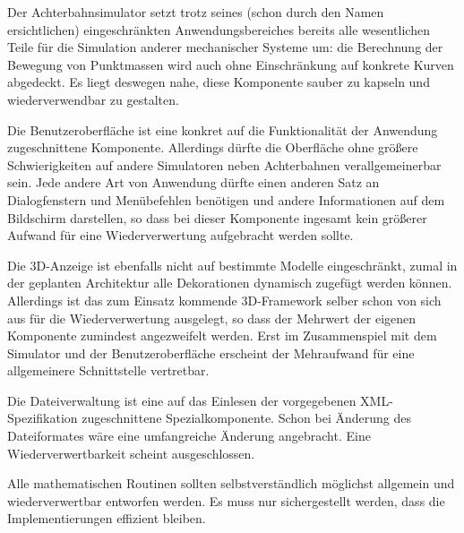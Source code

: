Der Achterbahnsimulator setzt trotz seines (schon durch den Namen ersichtlichen)
eingeschränkten Anwendungsbereiches bereits alle wesentlichen Teile für die
Simulation anderer mechanischer Systeme um: die Berechnung der Bewegung von
Punktmassen wird auch ohne Einschränkung auf konkrete Kurven abgedeckt. Es liegt
deswegen nahe, diese Komponente sauber zu kapseln und wiederverwendbar zu gestalten.

Die Benutzeroberfläche ist eine konkret auf die Funktionalität der Anwendung
zugeschnittene Komponente. Allerdings dürfte die Oberfläche ohne größere
Schwierigkeiten auf andere Simulatoren neben Achterbahnen verallgemeinerbar sein.
Jede andere Art von Anwendung dürfte einen anderen Satz an Dialogfenstern und
Menübefehlen benötigen und andere Informationen auf dem Bildschirm darstellen,
so dass bei dieser Komponente ingesamt kein größerer Aufwand für eine
Wiederverwertung aufgebracht werden sollte.

Die 3D-Anzeige ist ebenfalls nicht auf bestimmte Modelle eingeschränkt, zumal in
der geplanten Architektur alle Dekorationen dynamisch zugefügt werden können.
Allerdings ist das zum Einsatz kommende 3D-Framework selber schon von sich aus 
für die Wiederverwertung ausgelegt, so dass der Mehrwert der eigenen Komponente
zumindest angezweifelt werden. Erst im Zusammenspiel mit dem Simulator und der 
Benutzeroberfläche erscheint der Mehraufwand für eine allgemeinere Schnittstelle
vertretbar.

Die Dateiverwaltung ist eine auf das Einlesen der vorgegebenen XML-Spezifikation 
zugeschnittene Spezialkomponente. Schon bei Änderung des Dateiformates wäre eine
umfangreiche Änderung angebracht. Eine Wiederverwertbarkeit scheint ausgeschlossen.

Alle mathematischen Routinen sollten selbstverständlich möglichst allgemein und
wiederverwertbar entworfen werden. Es muss nur sichergestellt werden, dass die
Implementierungen effizient bleiben.
